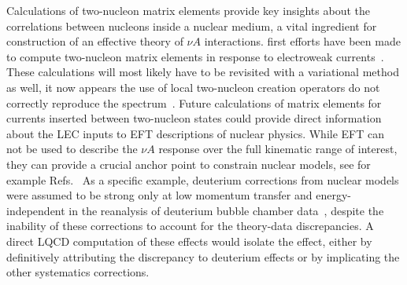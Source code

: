 Calculations of two-nucleon matrix elements provide key insights
 about the correlations between nucleons inside a nuclear medium,
 a vital ingredient for construction of an effective theory
 of $\nu A$ interactions.
 first efforts have been made to compute two-nucleon matrix elements in response to electroweak currents~\cite{Savage:2016kon,Chang:2017eiq}.
These calculations will most likely have to be revisited with a variational method as well,
  it now appears the use of local two-nucleon creation operators do not correctly
 reproduce the spectrum~\cite{Francis:2018qch,Horz:2020zvv,Green:2021qol,Amarasinghe:2021lqa}.
%
Future calculations of matrix elements for currents inserted between
 two-nucleon states could provide direct information about the LEC inputs to EFT descriptions of nuclear physics.
While EFT can not be used to describe the $\nu A$ response over the full kinematic range of interest, they can provide a crucial anchor point to constrain nuclear models, see for example Refs.~\cite{Kronfeld:2019nfb,Drischler:2019xuo,Tews:2020hgp,Davoudi:2020ngi}
As a specific example, deuterium corrections from nuclear models were assumed to be strong only at low momentum transfer
 and energy-independent in the reanalysis of deuterium bubble chamber data~\cite{Meyer:2016oeg},
 despite the inability of these corrections to account for the theory-data discrepancies.
A direct LQCD computation of these effects would isolate the effect,
 either by definitively attributing the discrepancy to deuterium effects
 or by implicating the other systematics corrections.

